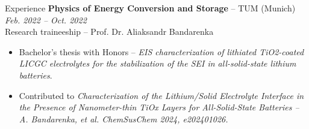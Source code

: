 \documentclass{resume} %
\begin{document}
\begin{rSection}{Experience}
    {\bf Physics of Energy Conversion and Storage} -- TUM (Munich) \hfill {\em Feb. 2022 -- Oct. 2022} 
    \\ Research traineeship -- Prof. Dr. Aliaksandr Bandarenka \\
    \begin{itemize}
        \item Bachelor's thesis with Honors -- \textit{EIS characterization of lithiated TiO2-coated LICGC electrolytes for the stabilization of the SEI in all-solid-state lithium batteries}.
        \item Contributed to \textit{Characterization of the Lithium/Solid Electrolyte Interface in the Presence of Nanometer-thin TiOx Layers for All-Solid-State Batteries -- A. Bandarenka, et al. ChemSusChem 2024, e202401026.}
    \end{itemize}
\end{rSection}

\end{document}
